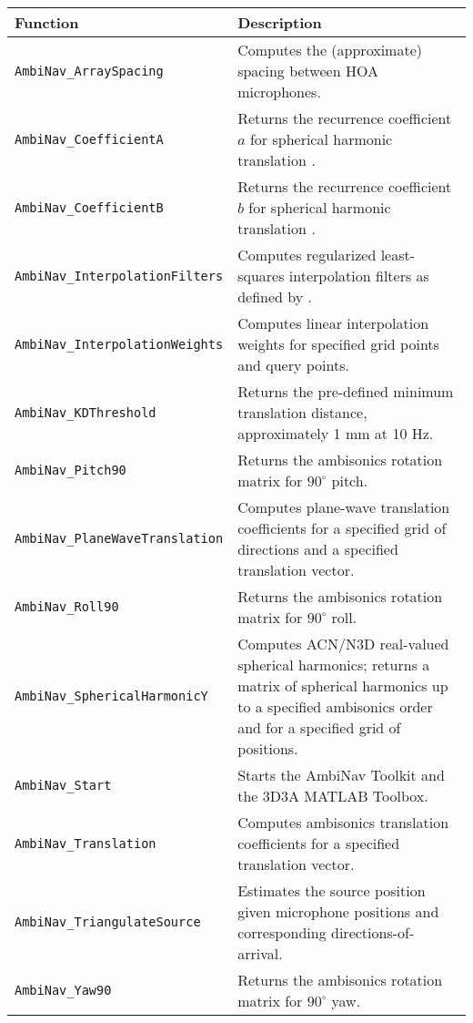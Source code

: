 \documentclass[11pt, oneside]{article}
\begin{document}
\begin{table}
\centering
  \begin{tabular}{| l | p{11cm} |}
    \hline
    \textbf{Function} & \textbf{Description} \\ \hline
    \texttt{AmbiNav\_ArraySpacing} & Computes the (approximate) spacing between HOA microphones. \\ \hline
    \texttt{AmbiNav\_CoefficientA} & Returns the recurrence coefficient $a$ for spherical harmonic translation \citep[Eq. (145)]{Zotter2009PhD}. \\ \hline
    \texttt{AmbiNav\_CoefficientB} & Returns the recurrence coefficient $b$ for spherical harmonic translation \citep[Eq. (146)]{Zotter2009PhD}. \\ \hline
    \texttt{AmbiNav\_InterpolationFilters} & Computes regularized least-squares interpolation filters as defined by \citet{TylkaChoueiri2016}. \\ \hline
    \texttt{AmbiNav\_InterpolationWeights} & Computes linear interpolation weights for specified grid points and query points. \\ \hline
    \texttt{AmbiNav\_KDThreshold} & Returns the pre-defined minimum translation distance, approximately 1 mm at 10 Hz. \\ \hline
    \texttt{AmbiNav\_Pitch90} & Returns the ambisonics rotation matrix for $90^\circ$ pitch. \\ \hline
    \texttt{AmbiNav\_PlaneWaveTranslation} & Computes plane-wave translation coefficients for a specified grid of directions and a specified translation vector. \\ \hline
    \texttt{AmbiNav\_Roll90} & Returns the ambisonics rotation matrix for $90^\circ$ roll. \\ \hline
    \texttt{AmbiNav\_SphericalHarmonicY} & Computes ACN/N3D real-valued spherical harmonics;
    	returns a matrix of spherical harmonics up to a specified ambisonics order and for a specified grid of positions. \\ \hline
    \texttt{AmbiNav\_Start} & Starts the AmbiNav Toolkit and the 3D3A MATLAB Toolbox. \\ \hline
    \texttt{AmbiNav\_Translation} & Computes ambisonics translation coefficients for a specified translation vector. \\ \hline
    \texttt{AmbiNav\_TriangulateSource} & Estimates the source position given microphone positions and corresponding directions-of-arrival. \\ \hline
    \texttt{AmbiNav\_Yaw90} & Returns the ambisonics rotation matrix for $90^\circ$ yaw. \\ \hline

\end{tabular}
\end{table}
\end{document}
